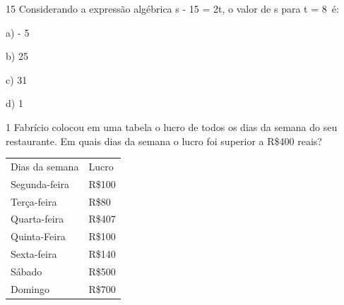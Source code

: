 

\num{15} Considerando a expressão algébrica s - 15 = 2t, o valor de s
para t = 8\  é:

a) - 5

b) 25

c) 31

d) 1




\num{1} Fabrício colocou em uma tabela o lucro de todos os dias da semana do
seu restaurante. Em quais dias da semana o lucro foi superior a R\$400
reais?

\begin{longtable}[]{@{}ll@{}}
\toprule
\endhead
Dias da semana & Lucro\tabularnewline
Segunda-feira & R\$100\tabularnewline
Terça-feira & R\$80\tabularnewline
Quarta-feira & R\$407\tabularnewline
Quinta-Feira & R\$100\tabularnewline
Sexta-feira & R\$140\tabularnewline
Sábado & R\$500\tabularnewline
Domingo & R\$700\tabularnewline
\bottomrule
\end{longtable}

